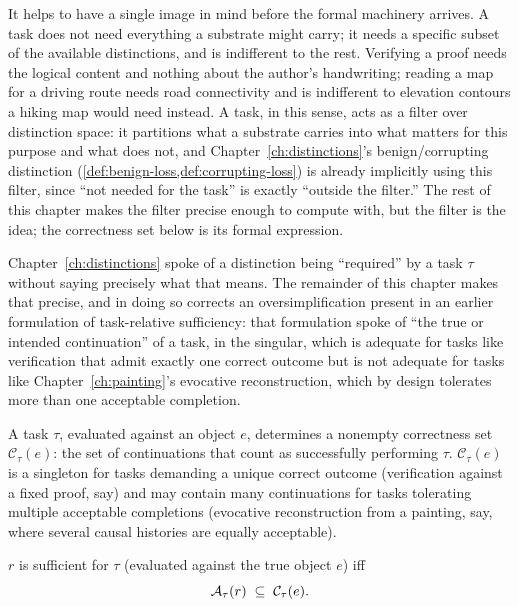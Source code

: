It helps to have a single image in mind before the formal machinery
arrives. A task does not need everything a substrate might carry; it
needs a specific subset of the available distinctions, and is
indifferent to the rest. Verifying a proof needs the logical content and
nothing about the author's handwriting; reading a map for a driving
route needs road connectivity and is indifferent to elevation contours a
hiking map would need instead. A task, in this sense, acts as a filter
over distinction space: it partitions what a substrate carries into
what matters for this purpose and what does not, and
Chapter~\ref{ch:distinctions}'s benign/corrupting distinction
(\cref{def:benign-loss,def:corrupting-loss}) is already implicitly using
this filter, since ``not needed for the task'' is exactly ``outside the
filter.'' The rest of this chapter makes the filter precise enough to
compute with, but the filter is the idea; the correctness set below is
its formal expression.

Chapter~\ref{ch:distinctions} spoke of a distinction being ``required'' by
a task $\tau$ without saying precisely what that means. The remainder of
this chapter makes that precise, and in doing so corrects an
oversimplification present in an earlier formulation of task-relative
sufficiency: that formulation spoke of ``the true or intended
continuation'' of a task, in the singular, which is adequate for tasks
like verification that admit exactly one correct outcome but is not
adequate for tasks like Chapter~\ref{ch:painting}'s evocative
reconstruction, which by design tolerates more than one acceptable
completion.

\begin{definition}
\label{def:correctness-set}
A task $\tau$, evaluated against an object $e$, determines a nonempty
correctness set $\mathcal{C}_\tau(e)$: the set of continuations that count
as successfully performing $\tau$. $\mathcal{C}_\tau(e)$ is a singleton for
tasks demanding a unique correct outcome (verification against a fixed
proof, say) and may contain many continuations for tasks tolerating
multiple acceptable completions (evocative reconstruction from a
painting, say, where several causal histories are equally acceptable).
\end{definition}

\begin{definition}
\label{def:sufficiency}
$r$ is sufficient for $\tau$ (evaluated against the true object $e$) iff
\[
\mathcal{A}_{\tau}(r) \;\subseteq\; \mathcal{C}_\tau(e).
\]
\end{definition}


